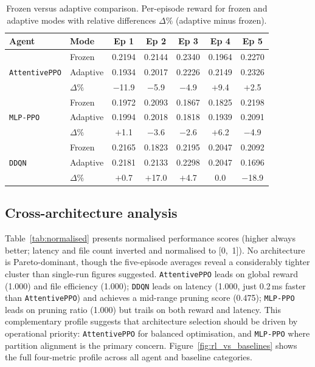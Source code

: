 \documentclass[fleqn,10pt]{wlscirep}
\newcommand{\attentive}{\texttt{AttentivePPO}}
\newcommand{\mlpppo}{\texttt{MLP-PPO}}
\newcommand{\ddqn}{\texttt{DDQN}}
\begin{document}
\begin{table}[!htbp]
\centering
\setlength{\tabcolsep}{4pt}
\begin{tabular}{llccccc}
\toprule
\textbf{Agent} & \textbf{Mode} & \textbf{Ep 1} & \textbf{Ep 2} &
  \textbf{Ep 3} & \textbf{Ep 4} & \textbf{Ep 5} \\
\midrule
\multirow{3}{*}{\attentive{}}
  & Frozen     & 0.2194     & 0.2144    & 0.2340     & 0.1964     & 0.2270 \\
  & Adaptive   & 0.1934     & 0.2017    & 0.2226     & 0.2149     & 0.2326 \\
  & $\Delta\%$ & $-$11.9    & $-$5.9    & $-$4.9     & $+$9.4     & $+$2.5 \\
\midrule
\multirow{3}{*}{\mlpppo{}}
  & Frozen     & 0.1972     & 0.2093    & 0.1867     & 0.1825     & 0.2198 \\
  & Adaptive   & 0.1994     & 0.2018    & 0.1818     & 0.1939     & 0.2091 \\
  & $\Delta\%$ & $+$1.1     & $-$3.6    & $-$2.6     & $+$6.2     & $-$4.9 \\
\midrule
\multirow{3}{*}{\ddqn{}}
  & Frozen     & 0.2165     & 0.1823    & 0.2195     & 0.2047     & 0.2092 \\
  & Adaptive   & 0.2181     & 0.2133    & 0.2298     & 0.2047     & 0.1696 \\
  & $\Delta\%$ & $+$0.7     & $+$17.0   & $+$4.7     & 0.0        & $-$18.9 \\
\bottomrule
\end{tabular}
\caption{\label{tab:fva}Frozen versus adaptive comparison. Per-episode reward for frozen
  and adaptive modes with relative differences $\Delta\%$ (adaptive
  minus frozen).}
\end{table}

\FloatBarrier

\subsection*{Cross-architecture analysis}
\label{sec:crossarch}

Table~\ref{tab:normalised} presents normalised performance scores
(higher always better; latency and file count inverted and normalised
to [0,~1]).
No architecture is Pareto-dominant, though the five-episode averages
reveal a considerably tighter cluster than single-run figures suggested.
\attentive{} leads on global reward (1.000) and file efficiency (1.000);
\ddqn{} leads on latency (1.000, just 0.2\,ms faster than \attentive{})
and achieves a mid-range pruning score (0.475); \mlpppo{} leads on
pruning ratio (1.000) but trails on both reward and latency.
This complementary profile suggests that architecture selection should
be driven by operational priority: \attentive{} for balanced
optimisation, and \mlpppo{} where partition alignment is the primary concern.
Figure~\ref{fig:rl_vs_baselines} shows the full four-metric profile
across all agent and baseline categories.
\end{document}
